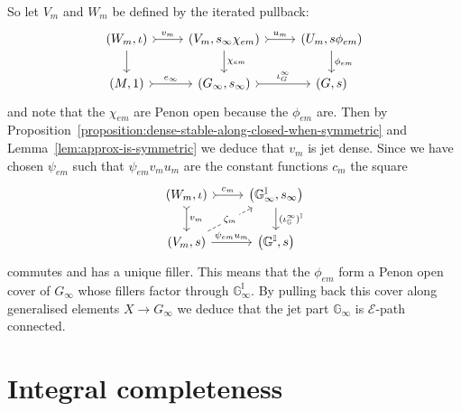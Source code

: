 \documentclass[pdftex]{sigma}
\numberwithin{equation}{section}
\begin{document}
So let $V_{m}$ and $W_{m}$ be def\/ined by the iterated pullback:
\begin{equation*}\begin{tikzcd}
(W_{m},\iota) \dar \rar[rightarrowtail]{v_m} & (V_{m},s_{\infty}\chi_{em}) \dar{\chi_{em}} \rar[rightarrowtail]{u_m} & (U_{m},s\phi_{em})\dar{\phi_{em}} \\
(M,1) \rar[rightarrowtail]{e_{\infty}} & (G_{\infty},s_{\infty}) \rar[rightarrowtail]{\iota^{\infty}_{G}} & (G,s)
\end{tikzcd}\end{equation*}
and note that the $\chi_{em}$ are Penon open because the $\phi_{em}$ are. Then by Proposition~\ref{proposition:dense-stable-along-closed-when-symmetric} and Lemma~\ref{lem:approx-is-symmetric} we deduce that $v_m$ is jet dense. Since we have chosen $\psi_{em}$ such that $\psi_{em} v_m u_m$ are the constant functions $c_m$ the square
\begin{equation*}\begin{tikzcd}
(W_m,\iota) \rar[rightarrowtail]{c_m} \dar[rightarrowtail]{v_m} & \big(\mathbb{G}_{\infty}^{\mathbb{I}},s_{\infty}\big) \dar{({\iota_{\mathbb{G}}^{\infty}})^{\mathbb{I}}}\\
(V_m,s) \urar[dashed][description]{\zeta_m} \rar{\psi_{em} u_m} & \big(\mathbb{G}^{\mathbb{I}},s\big)
\end{tikzcd}\end{equation*}
commutes and has a unique f\/iller. This means that the $\phi_{em}$ form a Penon open cover of $G_{\infty}$ whose f\/illers factor through $\mathbb{G}_{\infty}^{\mathbb{I}}$. By pulling back this cover along generalised elements $X \rightarrow G_{\infty}$ we deduce that the jet part $\mathbb{G}_{\infty}$ is $\mathcal{E}$-path connected.

\section{Integral completeness}\label{sec:integral-completeness}
\end{document}
